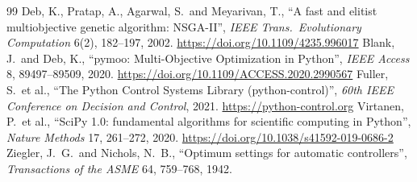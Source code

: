 \documentclass[a4paper,11pt]{article}
\begin{document}
\begin{thebibliography}{99}
 Deb, K., Pratap, A., Agarwal, S.\ and Meyarivan, T., ``A fast and elitist multiobjective genetic algorithm: NSGA-II'', \emph{IEEE Trans.\ Evolutionary Computation} 6(2), 182--197, 2002. \url{https://doi.org/10.1109/4235.996017}
 Blank, J.\ and Deb, K., ``pymoo: Multi-Objective Optimization in Python'', \emph{IEEE Access} 8, 89497--89509, 2020. \url{https://doi.org/10.1109/ACCESS.2020.2990567}
 Fuller, S.\ et al., ``The Python Control Systems Library (python-control)'', \emph{60th IEEE Conference on Decision and Control}, 2021. \url{https://python-control.org}
 Virtanen, P.\ et al., ``SciPy 1.0: fundamental algorithms for scientific computing in Python'', \emph{Nature Methods} 17, 261--272, 2020. \url{https://doi.org/10.1038/s41592-019-0686-2}
 Ziegler, J.~G.\ and Nichols, N.~B., ``Optimum settings for automatic controllers'', \emph{Transactions of the ASME} 64, 759--768, 1942.
\end{thebibliography}
\end{document}
